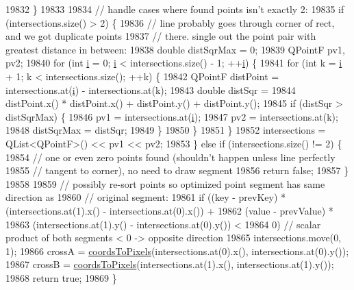 \begin{DoxyCode}
19832   \}
19833 
19834   \textcolor{comment}{// handle cases where found points isn't exactly 2:}
19835   \textcolor{keywordflow}{if} (intersections.size() > 2) \{
19836     \textcolor{comment}{// line probably goes through corner of rect, and we got duplicate points}
19837     \textcolor{comment}{// there. single out the point pair with greatest distance in between:}
19838     \textcolor{keywordtype}{double} distSqrMax = 0;
19839     QPointF pv1, pv2;
19840     \textcolor{keywordflow}{for} (\textcolor{keywordtype}{int} \hyperlink{_comparision_pictures_2_createtest_image_8m_a6f6ccfcf58b31cb6412107d9d5281426}{i} = 0; \hyperlink{_comparision_pictures_2_createtest_image_8m_a6f6ccfcf58b31cb6412107d9d5281426}{i} < intersections.size() - 1; ++\hyperlink{_comparision_pictures_2_createtest_image_8m_a6f6ccfcf58b31cb6412107d9d5281426}{i}) \{
19841       \textcolor{keywordflow}{for} (\textcolor{keywordtype}{int} k = \hyperlink{_comparision_pictures_2_createtest_image_8m_a6f6ccfcf58b31cb6412107d9d5281426}{i} + 1; k < intersections.size(); ++k) \{
19842         QPointF distPoint = intersections.at(\hyperlink{_comparision_pictures_2_createtest_image_8m_a6f6ccfcf58b31cb6412107d9d5281426}{i}) - intersections.at(k);
19843         \textcolor{keywordtype}{double} distSqr =
19844             distPoint.x() * distPoint.x() + distPoint.y() + distPoint.y();
19845         \textcolor{keywordflow}{if} (distSqr > distSqrMax) \{
19846           pv1 = intersections.at(\hyperlink{_comparision_pictures_2_createtest_image_8m_a6f6ccfcf58b31cb6412107d9d5281426}{i});
19847           pv2 = intersections.at(k);
19848           distSqrMax = distSqr;
19849         \}
19850       \}
19851     \}
19852     intersections = QList<QPointF>() << pv1 << pv2;
19853   \} \textcolor{keywordflow}{else} \textcolor{keywordflow}{if} (intersections.size() != 2) \{
19854     \textcolor{comment}{// one or even zero points found (shouldn't happen unless line perfectly}
19855     \textcolor{comment}{// tangent to corner), no need to draw segment}
19856     \textcolor{keywordflow}{return} \textcolor{keyword}{false};
19857   \}
19858 
19859   \textcolor{comment}{// possibly re-sort points so optimized point segment has same direction as}
19860   \textcolor{comment}{// original segment:}
19861   \textcolor{keywordflow}{if} ((key - prevKey) * (intersections.at(1).x() - intersections.at(0).x()) +
19862           (value - prevValue) *
19863               (intersections.at(1).y() - intersections.at(0).y()) <
19864       0) \textcolor{comment}{// scalar product of both segments < 0 -> opposite direction}
19865     intersections.move(0, 1);
19866   crossA = \hyperlink{class_q_c_p_abstract_plottable_ade710a776104b14c1c835168ce1bfc5c}{coordsToPixels}(intersections.at(0).x(), intersections.at(0).y());
19867   crossB = \hyperlink{class_q_c_p_abstract_plottable_ade710a776104b14c1c835168ce1bfc5c}{coordsToPixels}(intersections.at(1).x(), intersections.at(1).y());
19868   \textcolor{keywordflow}{return} \textcolor{keyword}{true};
19869 \}
\end{DoxyCode}


